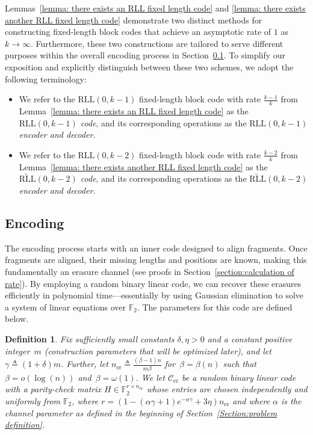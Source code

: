 \documentclass[journal,letterpaper,onecolumn,11pt]{IEEEtran}
\newcommand{\cC}{\mathcal{C}}
\newtheorem{definition}{Definition}
\begin{document}
Lemmas~\ref{lemma: there exists an RLL fixed length code} and \ref{lemma: there exists another RLL fixed length code} demonstrate two distinct methods for constructing fixed-length block codes that achieve an asymptotic rate of $1$ as $k \to \infty$. 
Furthermore, these two constructions are tailored to serve different purposes within the overall encoding process in Section~\ref{section: improved encoding}.
To simplify our exposition and explicitly distinguish between these two schemes, we adopt the following terminology:
\begin{itemize}
\item We refer to the $\mathrm{RLL}(0,k-1)$ fixed-length block code with rate $\frac{k-1}{k}$ from Lemma~\ref{lemma: there exists an RLL fixed length code} as the \textit{$\mathrm{RLL}(0,k-1)$ code}, and its corresponding operations as the \textit{$\mathrm{RLL}(0,k-1)$ encoder and decoder}.
\item We refer to the $\mathrm{RLL}(0,k-2)$ fixed-length block code with rate $\frac{k-2}{k}$ from Lemma~\ref{lemma: there exists another RLL fixed length code} as the \textit{$\widetilde{\mathrm{RLL}}(0,k-2)$ code}, and its corresponding operations as the \textit{$\widetilde{\mathrm{RLL}}(0,k-2)$ encoder and decoder}.
\end{itemize}
\subsection{Encoding}\label{section: improved encoding}

The encoding process starts with an inner code designed to align fragments. 
Once fragments are aligned, their missing lengths and positions are known, making this fundamentally an erasure channel (see proofs in Section~\ref{section:calculation of rate}).
By employing a random binary linear code, we can recover these erasures efficiently in polynomial time—essentially by using Gaussian elimination to solve a system of linear equations over $\mathbb{F}_2$. 
The parameters for this code are defined below.
\begin{definition}\label{definition:random linear erasure code}
Fix sufficiently small constants $\delta,\eta>0$ and a constant positive integer~$m$ (construction parameters that will be optimized later), and let $\gamma\triangleq(1+\delta)m$.
Further, let $n_{\mathrm{er}} \triangleq \frac{(\beta-1)n}{m\beta}$ for~$\beta=\beta(n)$ such that~$\beta=o(\log(n))$ and~$\beta=\omega(1)$.
We let $\cC_{\mathrm{er}}$ be a \emph{random binary linear code} with a parity-check matrix $H\in\mathbb{F}_2^{r\times n_{\mathrm{er}}}$ whose entries are chosen independently and uniformly from $\mathbb{F}_2$,
where $r=\left( 1-(\alpha\gamma+1)e^{-\alpha\gamma}+3\eta\right)n_{\mathrm{er}}$ and where $\alpha$ is the channel parameter as defined in the beginning of Section~\ref{Section:problem definition}.
\end{definition}
\end{document}

